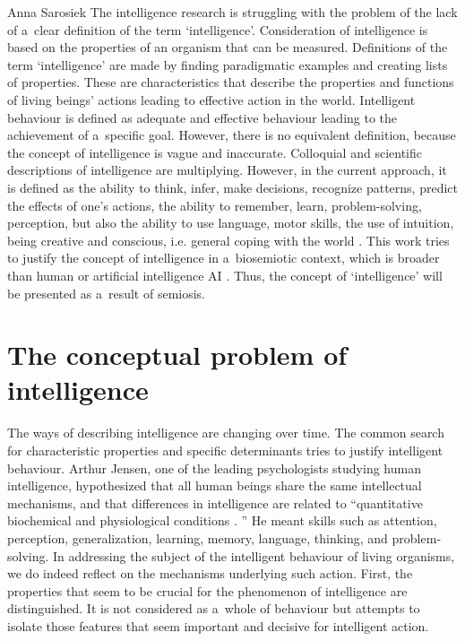\begin{artengenv}{Anna Sarosiek}
The intelligence research is struggling with the problem of the lack of a~clear definition of the term ‘intelligence’. Consideration of intelligence is based on the properties of an organism that can be measured. Definitions of the term ‘intelligence’ are made by finding paradigmatic examples and creating lists of properties. These are characteristics that describe the properties and functions of living beings’ actions leading to effective action in the world. Intelligent behaviour is defined as adequate and effective behaviour leading to the achievement of a~specific goal. However, there is no equivalent definition, because the concept of intelligence is vague and inaccurate. Colloquial and scientific descriptions of intelligence are multiplying. However, in the current approach, it is defined as the ability to think, infer, make decisions, recognize patterns, predict the effects of one’s actions, the ability to remember, learn, problem-solving, perception, but also the ability to use language, motor skills, the use of intuition, being creative and conscious, i.e. general coping with the world
\parencite[][]{rosen_fundamentals_1978}. %
 This work tries to justify the concept of intelligence in a~biosemiotic context, which is broader than human
\parencites[][]{byrne_2004}[][]{goldstein_2015}[][]{pfeifer_2006}[][]{spearman_1904}[][]{thorndike_animal_2017} %
 or artificial intelligence AI 
\parencites[][]{brooks_1986}[][]{kurzweil_1990}. %
Thus, the concept of ‘intelligence’ will be presented as a~result of semiosis.

\section*{The conceptual problem of intelligence}
The ways of describing intelligence are changing over time. The common search for characteristic properties and specific determinants tries to justify intelligent behaviour. Arthur Jensen, one of the leading psychologists studying human intelligence, hypothesized that all human beings share the same intellectual mechanisms, and that differences in intelligence are related to ``quantitative biochemical and physiological conditions
\parencite[][]{hoffmeyer_unfolding_1998}.%
'' He meant skills such as attention, perception, generalization, learning, memory, language, thinking, and problem-solving. In addressing the subject of the intelligent behaviour of living organisms, we do indeed reflect on the mechanisms underlying such action. First, the properties that seem to be crucial for the phenomenon of intelligence are distinguished. It is not considered as a~whole of behaviour but attempts to isolate those features that seem important and decisive for intelligent action.


\end{artengenv}
